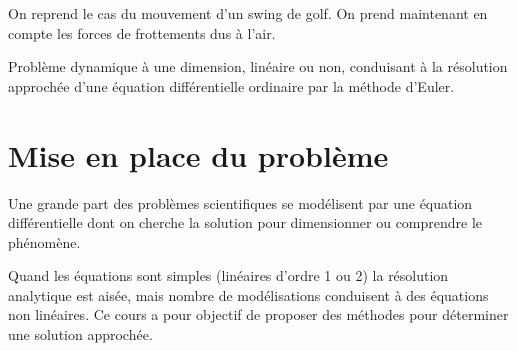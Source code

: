 \documentclass[10pt]{article}
\begin{document}

\begin{minipage}[c]{.2\linewidth}
\begin{center}
\end{center}
\end{minipage}\hfill
\begin{minipage}[c]{.33\linewidth}
\begin{center}
\end{center}
\end{minipage}\hfill
\begin{minipage}[c]{.45\linewidth}
\begin{center}
\end{center}
\end{minipage}
\vspace{.5cm}

On reprend le cas du mouvement d'un swing de golf. On prend maintenant en compte les forces de frottements dus à l'air. 

\begin{savoir}
Problème dynamique à une dimension,  linéaire ou non, conduisant à la résolution approchée d’une équation différentielle ordinaire par la méthode d’Euler.
\end{savoir}



\setlength{\parskip}{0ex plus 0.2ex minus 0ex}
 \renewcommand{\contentsname}{}
 \renewcommand{\baselinestretch}{1}

\tableofcontents

 \renewcommand{\baselinestretch}{1.2}
\setlength{\parskip}{2ex plus 0.5ex minus 0.2ex}





\section{Mise en place du problème}

Une grande part des problèmes scientifiques se modélisent par une équation différentielle dont on cherche la solution pour dimensionner ou comprendre le phénomène.

Quand les équations sont simples (linéaires d'ordre 1 ou 2) la résolution analytique est aisée, mais nombre de modélisations conduisent à des équations non linéaires.  Ce cours a pour objectif de proposer des méthodes pour déterminer une solution approchée.
\end{document}
